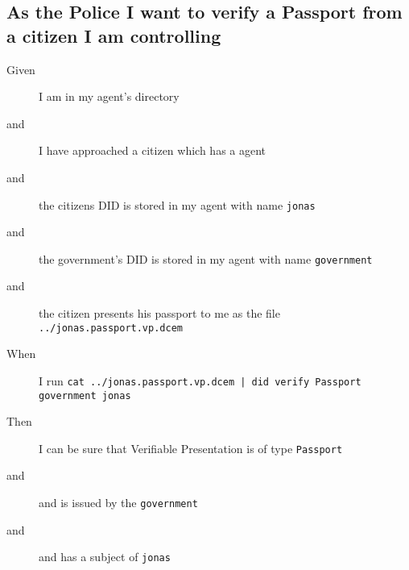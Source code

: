 \subsection{As the Police I want to verify a Passport from a citizen I am controlling}
\begin{description}\begin{description}
    \item[Given] I am in my agent's directory
    \item[and] I have approached a citizen which has a agent
    \item[and] the citizens DID is stored in my agent with name \texttt{jonas}
    \item[and] the government's DID is stored in my agent with name \texttt{government}
    \item[and] the citizen presents his passport to me as the file \texttt{../jonas.passport.vp.dcem}
    \item[When] I run \texttt{cat ../jonas.passport.vp.dcem | did verify Passport government jonas}
    \item[Then] I can be sure that Verifiable Presentation is of type \texttt{Passport}
    \item[and] and is issued by the \texttt{government}
    \item[and] and has a subject of \texttt{jonas}
\end{description}\end{description}

